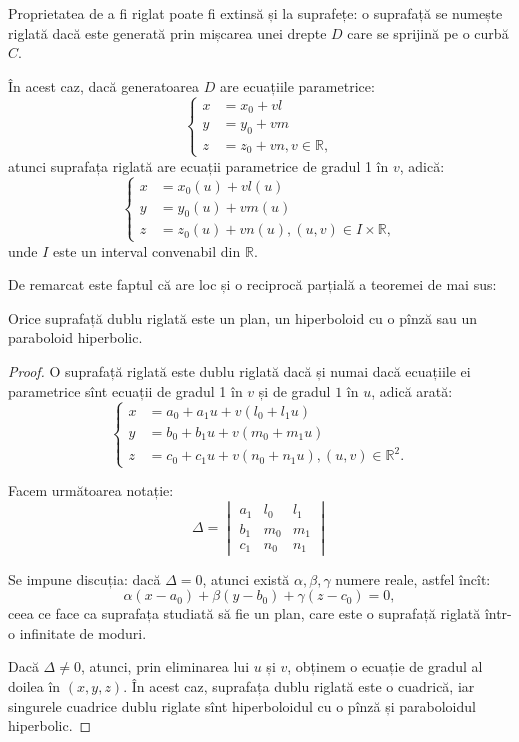 Proprietatea de a fi riglat poate fi extinsă și la suprafețe: o suprafață se
numește riglată dacă este generată prin mișcarea unei drepte $D$ care se 
sprijină pe o curbă $C$.

În acest caz, dacă generatoarea $D$ are ecuațiile parametrice: 
 \[
	\begin{cases}	
	    x &= x_0 + vl \\
	    y &= y_0 + vm \\
	    z &= z_0 + vn, v \in \mathbb{R},
    \end{cases}
\]
atunci suprafața riglată are ecuații parametrice de gradul 1 în $v$, adică: 
 \[
	\begin{cases}	
	    x &= x_0(u) + vl(u) \\
	    y &= y_0(u) + vm(u) \\
	    z &= z_0(u) + vn(u), (u,v) \in I \times \mathbb{R},
    \end{cases}
\]
unde $I$ este un interval convenabil din $\mathbb{R}$.

De remarcat este faptul că are loc și o reciprocă parțială a teoremei 
de mai sus:

\begin{theorem}
	Orice suprafață dublu riglată este un plan, un hiperboloid cu o pînză
sau un paraboloid hiperbolic.
\end{theorem}

\begin{proof}
	O suprafață riglată este dublu riglată dacă și numai dacă ecuațiile ei
parametrice sînt ecuații de gradul 1 în $v$ și de gradul $1$ în $u$, adică
arată: 
 \[
	\begin{cases}	
	    x &= a_0 + a_1 u + v(l_0 + l_1 u) \\
	    y &= b_0 + b_1 u + v(m_0 + m_1 u) \\
	    z &= c_0 + c_1 u + v(n_0 + n_1 u), (u, v) \in \mathbb{R}^2.
    \end{cases}
\]

Facem următoarea notație: 
 \[
	\Delta = \begin{vmatrix}
	             a_1 & l_0 & l_1 \\
	             b_1 & m_0 & m_1 \\
	             c_1 & n_0 & n_1
             \end{vmatrix}
\]

Se impune discuția: dacă $\Delta = 0$, atunci există $\alpha, \beta, \gamma$
numere reale, astfel încît: 
 \[
	\alpha (x - a_0) + \beta (y - b_0) + \gamma(z - c_0) = 0,
\]
ceea ce face ca suprafața studiată să fie un plan, care este o suprafață riglată
într-o infinitate de moduri.

Dacă $\Delta \neq 0$, atunci, prin eliminarea lui $u$ și $v$, obținem o ecuație
de gradul al doilea în $(x, y, z)$. În acest caz, suprafața dublu riglată este
o cuadrică, iar singurele cuadrice dublu riglate sînt hiperboloidul cu
o pînză și paraboloidul hiperbolic.
\end{proof}

